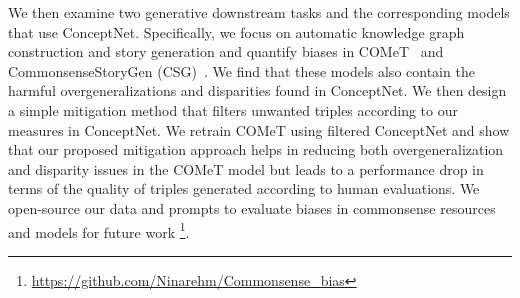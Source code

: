 We then examine two generative downstream tasks and the corresponding models that use ConceptNet. Specifically, we focus on automatic knowledge graph construction and story generation and quantify biases in COMeT~\cite{bosselut2019comet} and CommonsenseStoryGen (CSG)~\cite{guan2020knowledge}.
We find that these models also contain the harmful overgeneralizations and disparities found in ConceptNet.
We then design a simple mitigation method that filters unwanted triples according to our measures in ConceptNet.
We retrain COMeT using filtered ConceptNet and show that our proposed mitigation approach helps in reducing both overgeneralization and disparity issues in the COMeT model but leads to a performance drop in terms of the quality of triples generated according to human evaluations. %
We open-source our data and prompts to evaluate biases in commonsense resources and models for future work \footnote{\url{https://github.com/Ninarehm/Commonsense\_bias}}.

